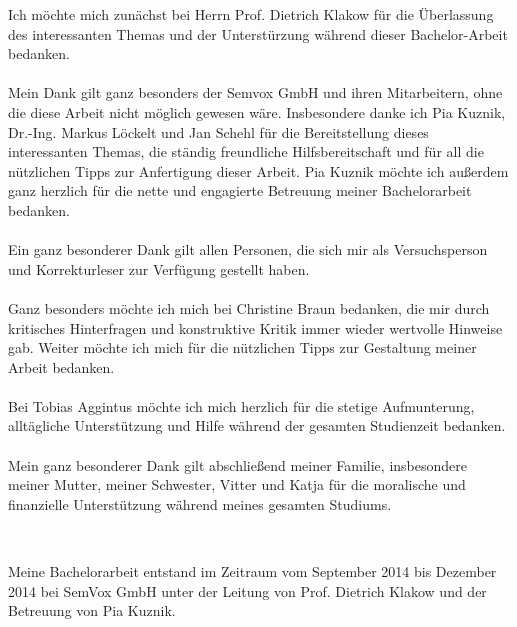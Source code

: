 \documentclass[12pt,a4paper]{scrartcl}
\begin{document}
Ich möchte mich zunächst bei Herrn Prof. Dietrich Klakow für die Überlassung des interessanten Themas und der Unterstürzung während dieser Bachelor-Arbeit bedanken.\\
\\
Mein Dank gilt ganz besonders der Semvox GmbH und ihren Mitarbeitern, ohne die diese Arbeit nicht möglich gewesen wäre. Insbesondere danke ich Pia Kuznik, Dr.-Ing. Markus Löckelt und Jan Schehl für die Bereitstellung dieses interessanten Themas, die ständig freundliche Hilfsbereitschaft und für all die nützlichen Tipps zur Anfertigung dieser Arbeit. 
Pia Kuznik möchte ich außerdem ganz herzlich für die nette und engagierte Betreuung meiner Bachelorarbeit bedanken.\\
\\
Ein ganz besonderer Dank gilt allen Personen, die sich mir als Versuchsperson und Korrekturleser zur Verfügung
gestellt haben.\\
\\
Ganz besonders möchte ich mich bei Christine Braun bedanken, die mir durch kritisches Hinterfragen und konstruktive Kritik immer wieder wertvolle Hinweise gab. Weiter möchte ich mich für die nützlichen Tipps zur Gestaltung meiner Arbeit bedanken.\\
\\
Bei Tobias Aggintus möchte ich mich herzlich für die stetige Aufmunterung, alltägliche Unterstützung und Hilfe während der gesamten Studienzeit bedanken. \\
\\
Mein ganz besonderer Dank gilt abschließend meiner Familie, insbesondere meiner Mutter, meiner Schwester, Vitter und Katja für die moralische und finanzielle Unterstützung während meines gesamten Studiums. \\
\cleardoublepage

$\,$\\
\vfill
\markboth{ }{ }
Meine Bachelorarbeit entstand im Zeitraum vom September 2014 bis Dezember 2014 bei SemVox GmbH unter der Leitung von Prof. Dietrich Klakow und der Betreuung von Pia Kuznik.


\cleardoublepage




\cleardoublepage
\tableofcontents
\cleardoublepage

\end{document}
